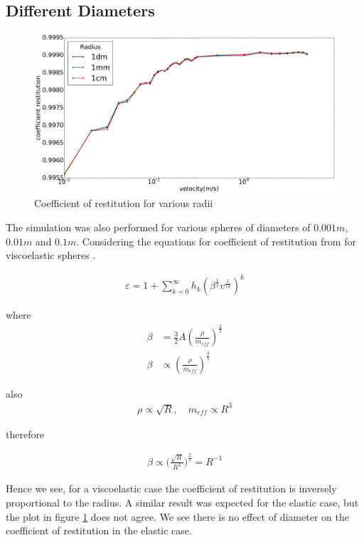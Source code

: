 
\subsection{Different Diameters}

\begin{figure}[H]
\includegraphics[width=1.0\textwidth]{../images/parametricStudy/CORvsVELdiffDAI_pdf.pdf}
\caption{Coefficient of restitution for various radii}
\label{fig:CORDiffDia}
\end{figure}

The simulation was also performed for various spheres of diameters of $0.001m$, $0.01m$ and $0.1m$. Considering the equations for coefficient of restitution from \citep{muller} for viscoelastic spheres .

\begin{align*}
\varepsilon = 1+ \sum_{k=0}^{\infty} h_{k}(\beta^{\frac{1}{2}} v^{\frac{1}{10}})^{k} 
\end{align*}

where
\begin{align*}
\beta &= \frac{3}{2} A (\frac{\rho}{m_{eff}})^{\frac{2}{5}} \\
\beta &\propto (\frac{\rho}{m_{eff}})^{\frac{2}{5}}
\end{align*}

also 
\begin{align*}
\rho \propto \sqrt{R}, \quad m_{eff} \propto R^{3}
\end{align*}

therefore

\begin{align*}
\beta \propto \Big( \frac{\sqrt{R}}{R^{3}} \Big)^{\frac{2}{5}} = R^{-1}
\end{align*}

Hence we see, for a viscoelastic case the coefficient of restitution is inversely proportional to the radius. A similar result was expected for the elastic case, but the plot in figure \ref{fig:CORDiffDia} does not agree. We see there is no effect of diameter on the coefficient of restitution in the elastic case.



